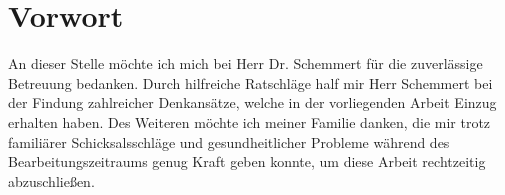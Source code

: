 \chapter{Vorwort}
An dieser Stelle möchte ich mich bei Herr Dr. Schemmert für die zuverlässige Betreuung bedanken. Durch hilfreiche Ratschläge half mir Herr Schemmert bei der Findung zahlreicher Denkansätze, welche in der vorliegenden Arbeit Einzug erhalten haben. Des Weiteren möchte ich meiner Familie danken, die mir trotz familiärer Schicksalsschläge und gesundheitlicher Probleme während des Bearbeitungszeitraums genug Kraft geben konnte, um diese Arbeit rechtzeitig abzuschließen.
